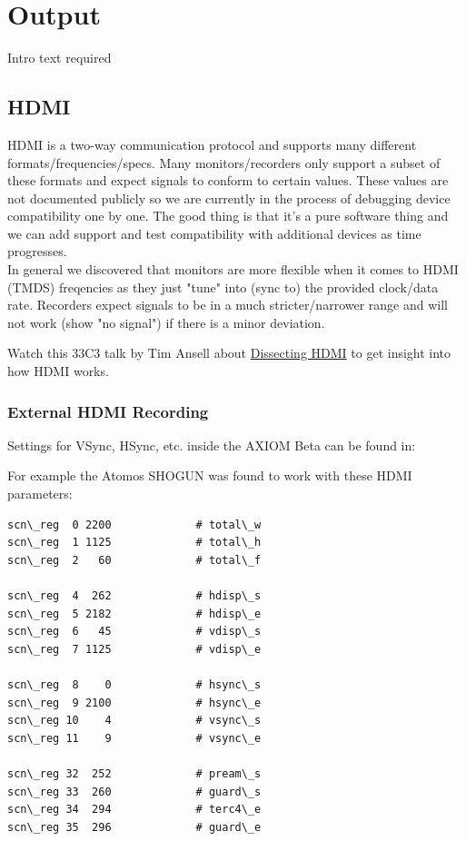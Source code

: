 \section{Output}

Intro text required




\subsection{HDMI}

HDMI is a two-way communication protocol and supports many different formats/frequencies/specs. Many monitors/recorders only support a subset of these formats and expect signals to conform to certain values. These values are not documented publicly so we are currently in the process of debugging device compatibility one by one. The good thing is that it's a pure software thing and we can add support and test compatibility with additional devices as time progresses.\\

In general we discovered that monitors are more flexible when it comes to HDMI (TMDS) freqencies as they just "tune" into (sync to) the provided clock/data rate. Recorders expect signals to be in a much stricter/narrower range and will not work (show "no signal") if there is a minor deviation. 

Watch this 33C3 talk by Tim Ansell about \href{https://media.ccc.de/v/33c3-8057-dissecting_hdmi}{Dissecting HDMI} to get insight into how HDMI works.




\subsubsection{External HDMI Recording}

Settings for VSync, HSync, etc. inside the AXIOM Beta can be found in: 


For example the Atomos SHOGUN was found to work with these HDMI parameters:  

\begin{lstlisting}[breaklines=true, breakatwhitespace=true]
scn\_reg  0 2200             # total\_w
scn\_reg  1 1125             # total\_h
scn\_reg  2   60             # total\_f

scn\_reg  4  262             # hdisp\_s
scn\_reg  5 2182             # hdisp\_e
scn\_reg  6   45             # vdisp\_s
scn\_reg  7 1125             # vdisp\_e

scn\_reg  8    0             # hsync\_s
scn\_reg  9 2100             # hsync\_e
scn\_reg 10    4             # vsync\_s
scn\_reg 11    9             # vsync\_e

scn\_reg 32  252             # pream\_s
scn\_reg 33  260             # guard\_s
scn\_reg 34  294             # terc4\_e
scn\_reg 35  296             # guard\_e
\end{lstlisting}

